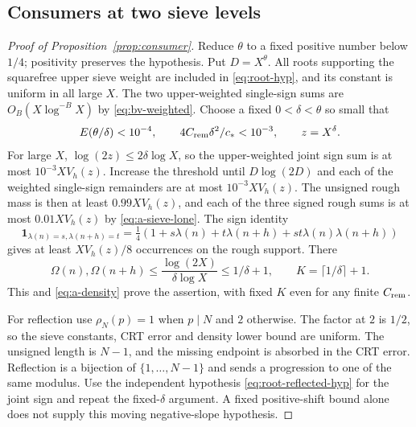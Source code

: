 \documentclass[11pt]{article}
\theoremstyle{definition}
\newcommand{\ind}{\mathbf 1}
\theoremstyle{remark}
\numberwithin{equation}{section}
\begin{document}
\subsection{Consumers at two sieve levels}
\begin{proof}[Proof of Proposition~\ref{prop:consumer}]
Reduce $\theta$ to a fixed positive number below $1/4$; positivity preserves the hypothesis.
Put $D=X^\theta$. All roots supporting the squarefree upper sieve weight are included in
\eqref{eq:root-hyp}, and its constant is uniform in all large $X$.
The two upper-weighted single-sign sums are $O_B(X\log^{-B}X)$ by \eqref{eq:bv-weighted}.
Choose a fixed $0<\delta<\theta$ so small that
\begin{equation}\label{eq:a-consumer-choices}
 E(\theta/\delta)<10^{-4},\qquad4C_{\rm rem}\delta^2/c_*<10^{-3},\qquad z=X^\delta.
\end{equation}
For large $X$, $\log(2z)\le2\delta\log X$, so the upper-weighted joint sign sum is at most
$10^{-3}XV_h(z)$. Increase the threshold until $D\log(2D)$ and each of the weighted single-sign
remainders are at most $10^{-3}XV_h(z)$. The unsigned rough mass is then at least $0.99XV_h(z)$,
and each of the three signed rough sums is at most $0.01XV_h(z)$ by \eqref{eq:a-sieve-lone}.
The sign identity
\begin{equation}\label{eq:a-unweighted-projection}
 \ind_{\lambda(n)=s,\lambda(n+h)=t}
 =\tfrac14(1+s\lambda(n)+t\lambda(n+h)+st\lambda(n)\lambda(n+h))
\end{equation}
gives at least $XV_h(z)/8$ occurrences on the rough support. There
\begin{equation}\label{eq:a-consumer-factor-count}
 \Omega(n),\Omega(n+h)\le\frac{\log(2X)}{\delta\log X}\le1/\delta+1,\qquad
 K=\lceil1/\delta\rceil+1.
\end{equation}
This and \eqref{eq:a-density} prove the assertion, with fixed $K$ even for any finite $C_{\rm rem}$.

For reflection use $\rho_N(p)=1$ when $p\mid N$ and $2$ otherwise. The factor at $2$ is $1/2$,
so the sieve constants, CRT error and density lower bound are uniform. The unsigned length is $N-1$,
and the missing endpoint is absorbed in the CRT error. Reflection is a bijection of
$\{1,\ldots,N-1\}$ and sends a progression to one of the same modulus. Use the independent
hypothesis \eqref{eq:root-reflected-hyp} for the joint sign and repeat the fixed-$\delta$ argument.
A fixed positive-shift bound alone does not supply this moving negative-slope hypothesis.


\end{proof}
\end{document}
